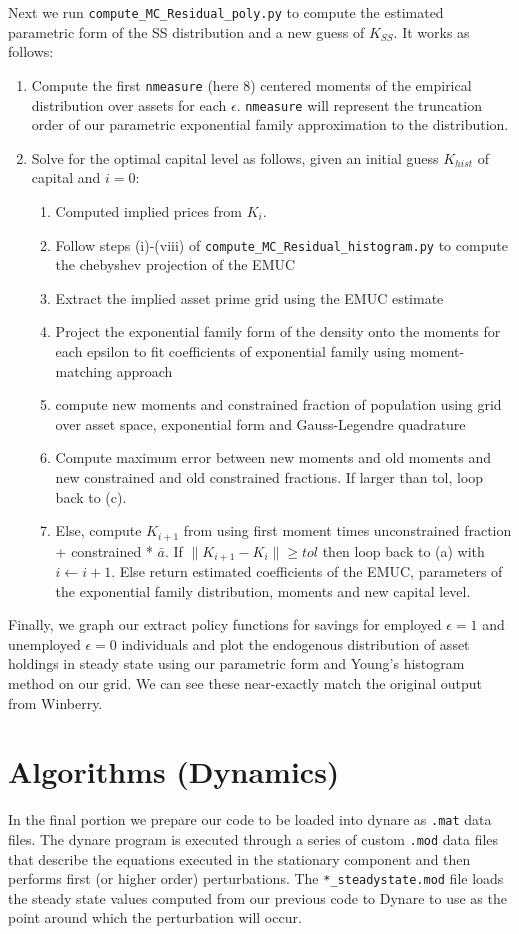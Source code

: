 \documentclass[11pt]{article}
\newcommand{\code}[1]{\texttt{#1}}
\begin{document}
Next we run \code{compute\_MC\_Residual\_poly.py} to compute the estimated parametric form of the SS distribution and a new guess of $K_{SS}$. It works as follows: 
\begin{enumerate}
	
\item Compute the first \code{nmeasure} (here 8) centered moments of the empirical distribution over assets for each $\epsilon$. \code{nmeasure} will represent the truncation order of our parametric exponential family approximation to the distribution.

\item 	Solve for the optimal capital level as follows, given an initial guess $K_{hist}$ of capital and $i=0$:
\begin{enumerate}
\item Computed implied prices from $K_i$.
\item Follow steps (i)-(viii) of \code{compute\_MC\_Residual\_histogram.py} to compute the chebyshev projection of the EMUC
\item Extract the implied asset prime grid using the EMUC estimate
\item Project the exponential family form of the density onto the moments for each epsilon to fit coefficients of exponential family using moment-matching approach
\item compute new moments and constrained fraction of population using grid over asset space, exponential form and Gauss-Legendre quadrature
\item Compute maximum error between new moments and old moments and new constrained and old constrained fractions. If larger than tol, loop back to (c). 
\item Else, compute $K_{i+1}$ from using  first moment  times unconstrained fraction + constrained * $\bar{a}$. If $\lVert K_{i+1} - K_{i}\rVert \geq  tol$ then loop back to (a) with $i \leftarrow i+1$.  Else return estimated coefficients of the EMUC, parameters of the exponential family distribution, moments and new capital level. 

\end{enumerate}
\end{enumerate}
Finally, we graph our extract policy functions for savings for employed $\epsilon =1$ and unemployed $\epsilon =0$ individuals and plot the endogenous distribution of asset holdings in steady state using our parametric form  and Young's histogram method on our grid. We can see these near-exactly match the original output from Winberry. \section{Algorithms (Dynamics)}
In the final portion we prepare our code to be loaded into dynare as \code{.mat} data files. The dynare program is executed through a series of custom \code{.mod} data files that describe the equations executed in the stationary component and then performs first (or higher order) perturbations. The \code{*\_steadystate.mod} file loads the steady state values computed from our previous code to Dynare to use as the point around which the perturbation will occur.
\end{document}
